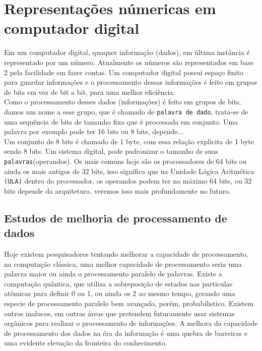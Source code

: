 \documentclass[12pt, onecolumn]{article}
\begin{document}
		\section{\centering Representações númericas em computador digital}
	
	Em um computador digital, quaquer informação (dados), em última instância
	é representado por um número. Atualmente os números são representados em base 2
	pela facilidade em fazer contas. Um computador digital possui espaço finito
	para guardar informações e o processamento dessas informações é feito em grupos
	de bits em vez de bit a bit, para uma melhor eficiência. \\
	\newline
	Como o processamento desses dados (informações) é feito em grupos de bits, damos
	um nome a esse grupo, que é chamado de \texttt{palavra de dado}, trata-se de uma
	sequência de bits de tamanho fixo que é processada em conjunto. Uma palavra
	por exemplo pode ter 16 bits ou 8 bits, depende...\\
	\newline
	Um conjunto de 8 bits é chamado de 1 byte, com essa relação explicita de 
	1 byte sendo 8 bits. Um sistema digital, pode padronizar o tamanho de suas 
	\texttt{palavras}(operandos). Os mais comuns hoje são os processadores de 
	64 bits	ou ainda os mais antigos de 32 bits, isso significa que na 
	Unidade Lógica Aritmética \texttt{(ULA)} dentro do processador, 
	os operandos podem ter no máximo 64 bits, ou 32 bits depende da arquitetura. 
	veremos isso mais profundamente no futuro.\\

	\subsection{\centering Estudos de melhoria de processamento de dados}
	
	Hoje existem pesquisadores tentando melhorar a capacidade de processamento, 
	na computação clássica, uma melhor capacidade de processamento seria uma palavra
	maior ou ainda o processamento paralelo de palavras. Existe a computação
	quântica, que utiliza a sobreposição de estados nas particulas atômicas para
	definir 0 ou 1, ou ainda os 2 ao mesmo tempo, gerando uma especie de 
	processamento paralelo bem avançado, porém, probabilistico. 
	Existem outros malucos, em outras áreas que pretendem futuramente 
	usar sistemas orgânicos para realizar o processamento de informações. 
	A melhora da capacidade de processamento dos dados na éra da informação 
	é uma quebra de barreiras e uma evidente elevação da fronteira do conhecimento.
		
\end{document}
